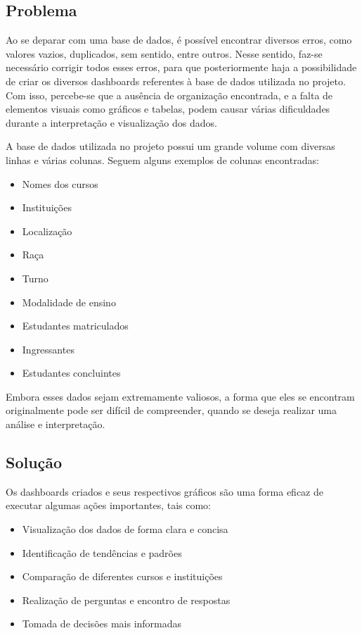 \documentclass[a4paper,12pt]{article}
\begin{document}
\subsection{Problema}
Ao se deparar com uma base de dados, é possível encontrar diversos erros, como valores vazios, duplicados, sem sentido, entre outros. Nesse sentido, faz-se necessário corrigir todos esses erros, para que posteriormente haja a possibilidade de criar os diversos dashboards referentes à base de dados utilizada no projeto. Com isso, percebe-se que a ausência de organização encontrada, e a falta de elementos visuais como gráficos e tabelas, podem causar várias dificuldades durante a interpretação e visualização dos dados.

A base de dados utilizada no projeto possui um grande volume com diversas linhas e várias colunas. Seguem alguns exemplos de colunas encontradas:
\begin{itemize}
    \item Nomes dos cursos
    \item Instituições
    \item Localização
    \item Raça
    \item Turno
    \item Modalidade de ensino
    \item Estudantes matriculados
    \item Ingressantes
    \item Estudantes concluintes
\end{itemize}

Embora esses dados sejam extremamente valiosos, a forma que eles se encontram originalmente pode ser difícil de compreender, quando se deseja realizar uma análise e interpretação.

\subsection{Solução}
Os dashboards criados e seus respectivos gráficos são uma forma eficaz de executar algumas ações importantes, tais como:
\begin{itemize}
    \item Visualização dos dados de forma clara e concisa
    \item Identificação de tendências e padrões
    \item Comparação de diferentes cursos e instituições
    \item Realização de perguntas e encontro de respostas
    \item Tomada de decisões mais informadas
\end{itemize}
\end{document}
